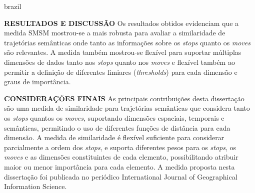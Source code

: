 {\begin{otherlanguage*}{brazil}
\begin{resumo}
        \textbf{RESULTADOS E DISCUSSÃO}
        \newline
        \newline
        Os resultados obtidos evidenciam que a medida SMSM mostrou-se a mais robusta para avaliar a similaridade de trajetórias semânticas onde tanto as informações sobre os \emph{stops} quanto os \emph{moves} são relevantes. A medida também mostrou-se flexível para suportar múltiplas dimensões de dados tanto nos \emph{stops} quanto nos \emph{moves} e flexível também ao permitir a definição de diferentes limiares (\emph{thresholds}) para cada dimensão e graus de importância.
        
        \newline
        \newline
        \textbf{CONSIDERAÇÕES FINAIS}
        \newline
        \newline
        As principais contribuições desta dissertação são uma medida de similaridade para trajetórias semânticas que considera tanto os \emph{stops} quantos os \emph{moves}, suportando dimensões espaciais, temporais e semânticas, permitindo o uso de diferentes funções de distância para cada dimensão. A medida de similaridade é flexível suficiente para considerar parcialmente a ordem dos \emph{stops}, e suporta diferentes pesos para os \emph{stops}, os \emph{moves} e as dimensões constituintes de cada elemento, possibilitando atribuir maior ou menor importância para cada elemento. A medida proposta nesta dissertação foi publicada no periódico International Journal of Geographical Information Science.

    \end{resumo}
    \end{otherlanguage*}
}
